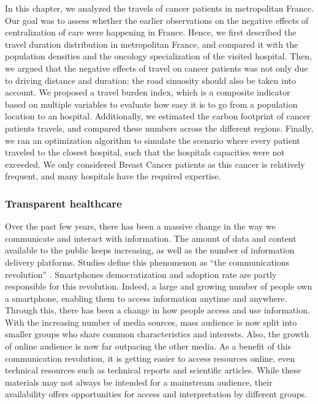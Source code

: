In this chapter, we analyzed the travels of cancer patients in metropolitan
France. Our goal was to assess whether the earlier observations on the negative
effects of centralization of care were happening in France. Hence, we first
described the travel duration distribution in metropolitan France, and compared
it with the population densities and the oncology specialization of the visited
hospital. Then, we argued that the negative effects of travel on cancer patients
was not only due to driving distance and duration: the road sinuosity should
also be taken into account. We proposed a travel burden index, which is a
composite indicator based on multiple variables to evaluate how easy it is to go
from a population location to an hospital. Additionally, we estimated the carbon
footprint of cancer patients travels, and compared these numbers across the
different regions. Finally, we ran an optimization algorithm to simulate the
scenario where every patient traveled to the closest hospital, such that the
hospitals capacities were not exceeded. We only considered Breast Cancer
patients as this cancer is relatively frequent, and many hospitals have the
required expertise.

\subsubsection{Transparent healthcare}

Over the past few years, there has been a massive change in the way we
communicate and interact with information. The amount of data and content
available to the public keeps increasing, as well as the number of information
delivery platforms. Studies define this phenomenon as ``the communications
revolution'' \cite{viswanath_communications_2012}. Smartphones democratization
and adoption rate are partly responsible for this revolution. Indeed, a large
and growing number of people own a smartphone, enabling them to access
information anytime and anywhere. Through this, there has been a change in how
people access and use information. With the increasing number of media sources,
mass audience is now split into smaller groups who share common characteristics
and interests. Also, the growth of online audience is now far outpacing the
other media. As a benefit of this communication revolution, it is getting easier
to access resources online, even technical resources such as technical reports
and scientific articles. While these materials may not always be intended for a
mainstream audience, their availability offers opportunities for access and
interpretation by different groups.

